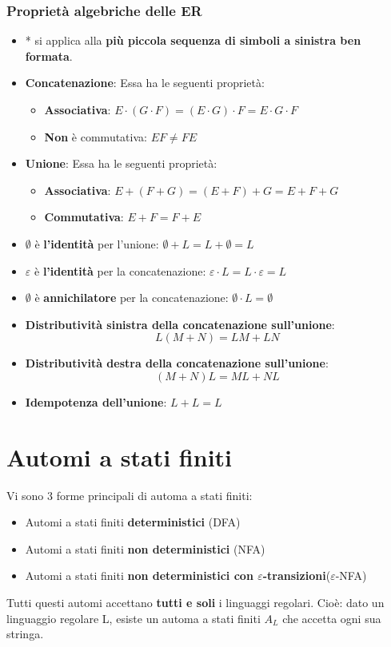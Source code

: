 \documentclass[12pt]{article}
\begin{document}
\subsubsection{Proprietà algebriche delle ER}
\begin{itemize}
    \item * si applica alla \textbf{più piccola sequenza di simboli a sinistra ben formata}.
    \item \textbf{Concatenazione}: Essa ha le seguenti proprietà:
    \begin{itemize}
        \item \textbf{Associativa}: $E \cdot (G \cdot F) = (E \cdot G) \cdot F = E \cdot G \cdot F$
        \item \textbf{Non} è commutativa: $EF \neq FE$
    \end{itemize}
    \item \textbf{Unione}: Essa ha le seguenti proprietà:
    \begin{itemize}
        \item \textbf{Associativa}: $E+(F+G) = (E+F)+G = E+F+G$
        \item \textbf{Commutativa}: $E+F = F+E$
    \end{itemize}
    \item $\emptyset$ è \textbf{l'identità} per l'unione: $\emptyset + L = L + \emptyset = L$
    \item $\varepsilon$ è \textbf{l'identità} per la concatenazione: $\varepsilon \cdot L = L \cdot \varepsilon = L$
    \item $\emptyset$ è \textbf{annichilatore} per la concatenazione: $\emptyset \cdot L = \emptyset$
    \item \textbf{Distributività sinistra della concatenazione sull'unione}: $$L(M+N) = LM + LN$$
    \item \textbf{Distributività destra della concatenazione sull'unione}: $$(M+N)L = ML + NL$$
    \item \textbf{Idempotenza dell'unione}: $L + L = L$
\end{itemize}
\section{Automi a stati finiti}
Vi sono 3 forme principali di automa a stati finiti:
\begin{itemize}
    \item Automi a stati finiti \textbf{deterministici} (DFA)
    \item Automi a stati finiti \textbf{non deterministici} (NFA)
    \item Automi a stati finiti \textbf{non deterministici con $\varepsilon$-transizioni}($\varepsilon$-NFA)
\end{itemize}
Tutti questi automi accettano \textbf{tutti e soli} i linguaggi regolari. Cioè: dato un linguaggio regolare L, esiste un automa a stati finiti $A_L$ che accetta ogni sua stringa.
\end{document}

